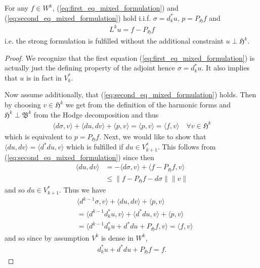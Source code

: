\documentclass[../master_thesis.tex]{subfiles}
\begin{document}
\begin{proposition}
    For any $f \in W^k$, (\ref{eq:first_eq_mixed_formulation}) and 
    (\ref{eq:second_eq_mixed_formulation}) hold i.i.f. 
    $\sigma = d^*_k u$, $p=P_\mathfrak{H}f$ and 
    \begin{align*}
        L^k u = f - P_\mathfrak{H}f
    \end{align*}
    i.e. the strong formulation is fulfilled without the additional 
    constraint $u \perp \mathfrak{H}^k$.
\end{proposition}
\begin{proof}
    We recognize that the first equation (\ref{eq:first_eq_mixed_formulation})
    is actually just the defining property of the adjoint hence 
    $\sigma = d^*_k u$. It also implies that $u$ is in fact in $V^*_k$.

    Now assume additionally, that  
    (\ref{eq:second_eq_mixed_formulation}) holds. Then by choosing $v \in \mathfrak{H}^k$
    we get from the definition of the harmonic forms 
    and $\mathfrak{H}^k \perp \mathfrak{B}^k$ from the Hodge decomposition and thus
    \begin{align*}
        \langle d\sigma, v \rangle + \langle du, dv \rangle + \langle p, v \rangle
        = \langle p, v \rangle = \langle f, v \rangle \quad \forall v \in \mathfrak{H}^k
    \end{align*}
    which is equivalent to $p = P_\mathfrak{H}f$. Next, we would like to show that 
    $\langle du, dv \rangle = \langle d^* du, v \rangle$ which is fulfilled if 
    $du \in V^*_{k+1}$. This follows from (\ref{eq:second_eq_mixed_formulation})
    since then 
    \begin{align*}
        \langle du, dv \rangle &= - \langle d\sigma, v \rangle + \langle f - P_\mathfrak{H}f, v \rangle
        \\ &\leq \lVert f - P_\mathfrak{H}f - d\sigma \rVert \lVert v \rVert
    \end{align*}
    and so $du \in V^*_{k+1}$.
    Thus we have 
    \begin{align*}
        &\langle d^{k-1}\sigma, v \rangle + \langle du, dv \rangle + \langle p, v \rangle
        \\ &= \langle d^{k-1} d^*_k u, v \rangle + \langle d^* du, v \rangle + \langle p, v \rangle
        \\ &= \langle d^{k-1} d^*_k u + d^* du + P_\mathfrak{H}f, v \rangle = \langle f, v \rangle
    \end{align*}
    and so since by assumption $V^k$ is dense in $W^k$,
    \begin{align*}
        d^*_k u + d^* du + P_\mathfrak{H}f = f.
    \end{align*}


\end{proof}
\end{document}
